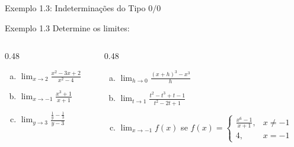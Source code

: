\documentclass[10pt,aspectratio=169]{beamer}
\begin{document}
\begin{frame}{Exemplo 1.3: Indeterminações do Tipo $0/0$}
    \transfade
    \begin{exampleblock}{Exemplo 1.3}
        Determine os limites:
        \vspace{0.2cm}
        \begin{columns}[t]
            \begin{column}{0.48\textwidth}
                \begin{enumerate}[(a)]
                    \item $\lim_{x \to 2} \frac{x^2-3x+2}{x^2-4}$
                    \vspace{0.2cm}\pause
                    \item $\lim_{x \to -1} \frac{x^3+1}{x+1}$
                    \vspace{0.2cm}\pause
                    \item $\lim_{y \to 3} \frac{\frac{1}{y}-\frac{1}{3}}{y-3}$
                \end{enumerate}
            \end{column}
            \begin{column}{0.48\textwidth}
                \begin{enumerate}[(d)]
                    \pause
                    \item $\lim_{h \to 0} \frac{(x+h)^3 - x^3}{h}$
                    \vspace{0.2cm}\pause
                    \item $\lim_{t \to 1} \frac{t^2-t^3+t-1}{t^2-2t+1}$
                    \vspace{0.2cm}\pause
                    \item $\lim_{x \to -1} f(x)$ se $f(x)=\begin{cases} \frac{x^6-1}{x+1}, & x \neq -1 \\ 4, & x = -1 \end{cases}$
                \end{enumerate}
            \end{column}
        \end{columns}
    \end{exampleblock}
\end{frame}
\end{document}
